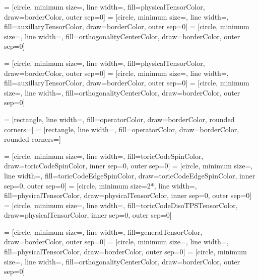 \def\tensorDistanceMPS{1.2*\defaultDistanceSmall}
\def\braketDistanceMPS{1.2*\defaultDistanceNormal}
\def\tensorWidthMPS{\smallTensorWidth}
\def\openLegMultiplierMPS{0.9}

 = [circle, minimum size=, line width=, fill=physicalTensorColor, draw=borderColor, outer sep=0]
 = [circle, minimum size=, line width=, fill=auxillaryTensorColor, draw=borderColor, outer sep=0]
 = [circle, minimum size=, line width=, fill=orthogonalityCenterColor, draw=borderColor, outer sep=0]

 = [circle, minimum size=\smallTensorWidth, line width=, fill=physicalTensorColor, draw=borderColor, outer sep=0]
 = [circle, minimum size=\smallTensorWidth, line width=, fill=auxillaryTensorColor, draw=borderColor, outer sep=0]
 = [circle, minimum size=\smallTensorWidth, line width=, fill=orthogonalityCenterColor, draw=borderColor, outer sep=0]

 = [rectangle, line width=, fill=operatorColor, draw=borderColor, rounded corners=\roundedCornerInsetNormal]
 = [rectangle, line width=, fill=operatorColor, draw=borderColor, rounded corners=\roundedCornerInsetSmall]

 = [circle, minimum size=\tinyTensorWidth, line width=, fill=toricCodeSpinColor, draw=toricCodeSpinColor, inner sep=0, outer sep=0]
 = [circle, minimum size=\tinyTensorWidth, line width=, fill=toricCodeEdgeSpinColor, draw=toricCodeEdgeSpinColor, inner sep=0, outer sep=0]
 = [circle, minimum size=2*\tinyTensorWidth, line width=, fill=physicalTensorColor, draw=physicalTensorColor, inner sep=0, outer sep=0]
 = [circle, minimum size=, line width=, fill=toricCodeDisoTPSTensorColor, draw=physicalTensorColor, inner sep=0, outer sep=0]

 = [circle, minimum size=\smallTensorWidth, line width=, fill=generalTensorColor, draw=borderColor, outer sep=0]
 = [circle, minimum size=\smallTensorWidth, line width=, fill=physicalTensorColor, draw=borderColor, outer sep=0]
 = [circle, minimum size=\smallTensorWidth, line width=, fill=orthogonalityCenterColor, draw=borderColor, outer sep=0]

